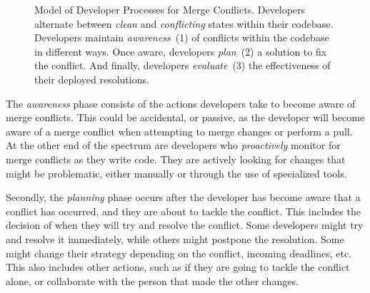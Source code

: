 
\begin{figure}[!htbp]
\centering
{}
\caption{Model of Developer Processes for Merge Conflicts. Developers alternate between \textit{clean} and \textit{conflicting} states within their codebase. Developers maintain \textit{awareness}~(1) of conflicts within the codebase in different ways. Once aware, developers \textit{plan}~(2) a solution to fix the conflict. And finally, developers \textit{evaluate}~(3) the effectiveness of their deployed resolutions.}
\label{model}
\end{figure}

The \emph{awareness} phase consists of the actions developers take to become aware of merge conflicts.
This could be accidental, or passive, as the developer will become aware of a merge conflict when attempting to merge changes or perform a pull.
At the other end of the spectrum are developers who \emph{proactively} monitor for merge conflicts as they write code.
They are actively looking for changes that might be problematic, either manually or through the use of specialized tools.

Secondly, the \emph{planning} phase occurs after the developer has become aware that a conflict has occurred, and they are about to tackle the conflict.
This includes the decision of when they will try and resolve the conflict.
Some developers might try and resolve it immediately, while others might postpone the resolution.
Some might change their strategy depending on the conflict, incoming deadlines, etc.
This also includes other actions, such as if they are going to tackle the conflict alone, or collaborate with the person that made the other changes.

